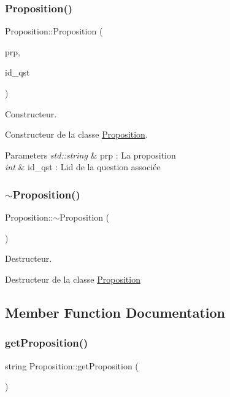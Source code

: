 \subsubsection{\texorpdfstring{Proposition()}{Proposition()}}
{\footnotesize\ttfamily Proposition\+::\+Proposition (\begin{DoxyParamCaption}\item[{string}]{prp,  }\item[{int}]{id\+\_\+qst }\end{DoxyParamCaption})}



Constructeur. 

Constructeur de la classe \mbox{\hyperlink{classProposition}{Proposition}}.


\begin{DoxyParams}{Parameters}
{\em std\+::string} & prp \+: La proposition \\
\hline
{\em int} & id\+\_\+qst \+: L\textquotesingle{}id de la question associée \\
\hline
\end{DoxyParams}
\mbox{\label{classProposition_a036537768e8ef96e1a10be0593bd0857}} 
\subsubsection{\texorpdfstring{$\sim$\+Proposition()}{~Proposition()}}
{\footnotesize\ttfamily Proposition\+::$\sim$\+Proposition (\begin{DoxyParamCaption}{ }\end{DoxyParamCaption})}



Destructeur. 

Destructeur de la classe \mbox{\hyperlink{classProposition}{Proposition}} 

\subsection{Member Function Documentation}
\mbox{\label{classProposition_a17ee28796e7b4193ff8a36ba36abb65a}} 
\subsubsection{\texorpdfstring{get\+Proposition()}{getProposition()}}
{\footnotesize\ttfamily string Proposition\+::get\+Proposition (\begin{DoxyParamCaption}{ }\end{DoxyParamCaption})}



